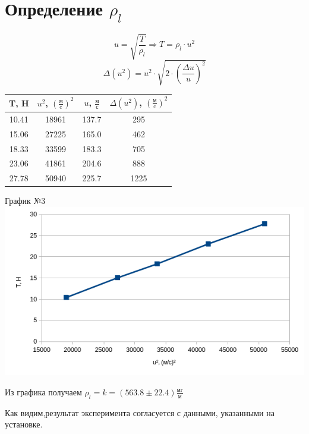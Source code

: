 \documentclass[a4paper,12pt]{article} %
\begin{document}
\section{Определение $\rho_l$}
\[u = \sqrt{\frac{T}{\rho_l}} \Rightarrow T = \rho_l \cdot u^2\]
\[\Delta (u^2) = u^2 \cdot\sqrt{2\cdot \left( \frac{\Delta u}{u}\right)^2}\]
\begin{center}
\begin{tabular}{|c|c|c|c|}
\hline
T, H     & $u^2$, $\left(\frac{\text{м}}{\text{c}}\right)^2$     & $u$, $\frac{\text{м}}{\text{с}}$     & $\Delta (u^2)$, $\left(\frac{\text{м}}{\text{c}}\right)^2$   \\ \hline
10.41 & 18961 & 137.7 & 295  \\ \hline
15.06 & 27225 & 165.0 & 462  \\ \hline
18.33 & 33599 & 183.3 & 705  \\ \hline
23.06 & 41861 & 204.6 & 888  \\ \hline
27.78 & 50940 & 225.7 & 1225 \\ \hline
\end{tabular}
\end{center}
\begin{center}
График №3
\includegraphics[scale=0.6]{graph2}
\end{center}
Из графика получаем $\rho_l = k = (563.8\pm22.4)\frac{\text{мг}}{\text{м}}$

Как видим,результат эксперимента согласуется с данными, указанными на установке.
\end{document}
